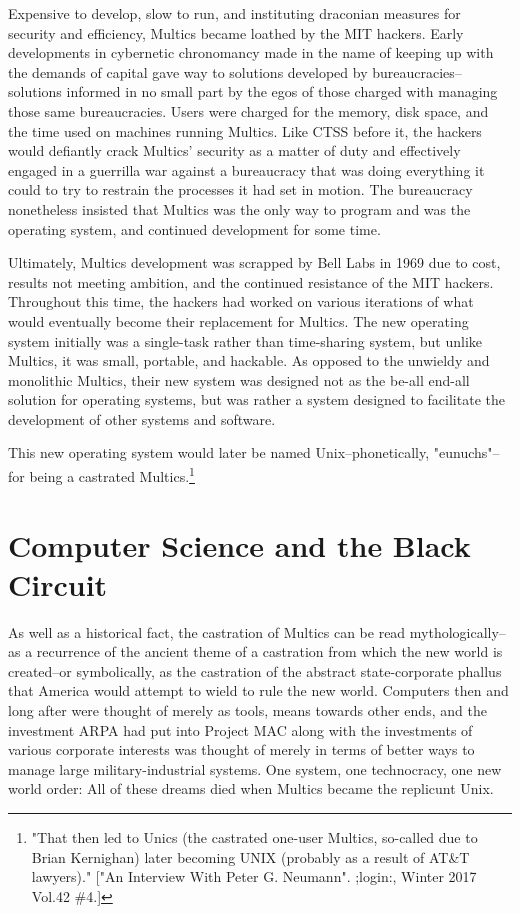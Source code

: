 \documentclass[12pt, a5paper, twoside, openright]{memoir}
\begin{document}
Expensive to develop, slow to run, and instituting draconian measures for security and efficiency, Multics became loathed by the MIT hackers. Early developments in cybernetic chronomancy made in the name of keeping up with the demands of capital gave way to solutions developed by bureaucracies--solutions informed in no small part by the egos of those charged with managing those same bureaucracies. Users were charged for the memory, disk space, and the time used on machines running Multics. Like CTSS before it, the hackers would defiantly crack Multics' security as a matter of duty and effectively engaged in a guerrilla war against a bureaucracy that was doing everything it could to try to restrain the processes it had set in motion. The bureaucracy nonetheless insisted that Multics was the only way to program and was the operating system, and continued development for some time.

Ultimately, Multics development was scrapped by Bell Labs in 1969 due to cost, results not meeting ambition, and the continued resistance of the MIT hackers. Throughout this time, the hackers had worked on various iterations of what would eventually become their replacement for Multics. The new operating system initially was a single-task rather than time-sharing system, but unlike Multics, it was small, portable, and hackable. As opposed to the unwieldy and monolithic Multics, their new system was designed not as the be-all end-all solution for operating systems, but was rather a system designed to facilitate the development of other systems and software.

This new operating system would later be named Unix--phonetically, "eunuchs"--for being a castrated Multics.\footnote{"That then led to Unics (the castrated one-user Multics, so-called due to Brian Kernighan) later becoming UNIX (probably as a result of AT\&T lawyers)." ["An Interview With Peter G. Neumann". ;login:, Winter 2017 Vol.42 \#4.]}

\chapter{Computer Science and the Black Circuit}

As well as a historical fact, the castration of Multics can be read mythologically--as a recurrence of the ancient theme of a castration from which the new world is created--or symbolically, as the castration of the abstract state-corporate phallus that America would attempt to wield to rule the new world. Computers then and long after were thought of merely as tools, means towards other ends, and the investment ARPA had put into Project MAC along with the investments of various corporate interests was thought of merely in terms of better ways to manage large military-industrial systems. One system, one technocracy, one new world order: All of these dreams died when Multics became the replicunt Unix.
\end{document}
